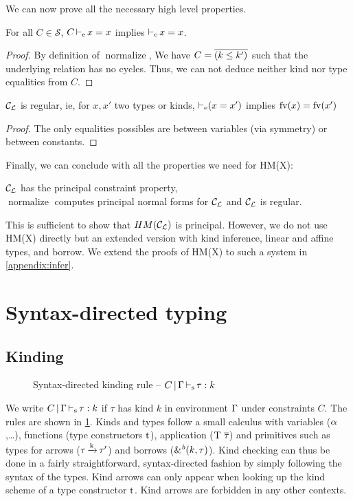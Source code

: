 We can now prove all the necessary high level properties.

\begin{lemma}
  For all $C\in\mathcal S$, $C \operatorname{\vdash_e} x = x$ implies
  $\operatorname{\vdash_e} x = x$.
\end{lemma}
\begin{proof}
  By definition of $\operatorname{normalize}$, We have $C = \overline{(k \leq k')_{{}}}$
  such that the underlying relation has no cycles.
  Thus, we can not deduce neither kind nor type equalities from $C$.
\end{proof}

\begin{property}
  ${\mathcal C_{\mathcal L}}$ is regular, ie, for $x, x'$ two types or kinds,
  $\operatorname{\vdash_e} (x = x')$ implies
  $\operatorname{fv}(x) = \operatorname{fv}(x')$
\end{property}
\begin{proof}
  The only equalities possibles are between variables (via symmetry) or
  between constants.
\end{proof}

Finally, we can conclude with all the properties we need for
HM(X):

\begin{theorem}
  ${\mathcal C_{\mathcal L}}$ has the principal constraint property,\\
  $\operatorname{normalize}$ computes principal normal forms for ${\mathcal C_{\mathcal L}}$
  and ${\mathcal C_{\mathcal L}}$ is regular.
\end{theorem}


This is sufficient to show that $HM({\mathcal C_{\mathcal L}})$ is principal. However,
we do not use HM(X) directly but an extended version with kind inference,
linear and affine types, and borrow.
We extend the proofs of HM(X) to such a system in \cref{appendix:infer}.


\section{Syntax-directed typing}
\label{appendix:sdtyping}

\subsection{Kinding}
%
\begin{figure}[bt]
  \centering
  
  \caption{Syntax-directed kinding rule --
    $C \operatorname{|} \Gamma \operatorname{\vdash_s} \tau : k$}
  \label{rules:sd-kinding}
\end{figure}

We write $C \operatorname{|} \Gamma \operatorname{\vdash_s} \tau : k$
if $\tau$ has kind $k$ in environment $\Gamma$ under constraints $C$.
The rules are shown in \cref{rules:sd-kinding}.
Kinds and types follow a small calculus with variables ($\alpha$,\dots),
functions (type constructors $\mathrm{t}$), application ($\mathrm{\mathrm{T}}\ \overline{\tau_{{}}}$)
and primitives such as types for arrows ($\tau\operatorname{\xrightarrow{k}}\tau'$) and
borrows (${\&}^{\textit{b}}(k,\tau)$).
Kind checking can thus be done in a fairly straightforward, syntax-directed
fashion by simply following
the syntax of the types. Kind arrows can only appear when looking
up the kind scheme of a type constructor $\mathrm{t}$. Kind arrows are forbidden
in any other contexts.

